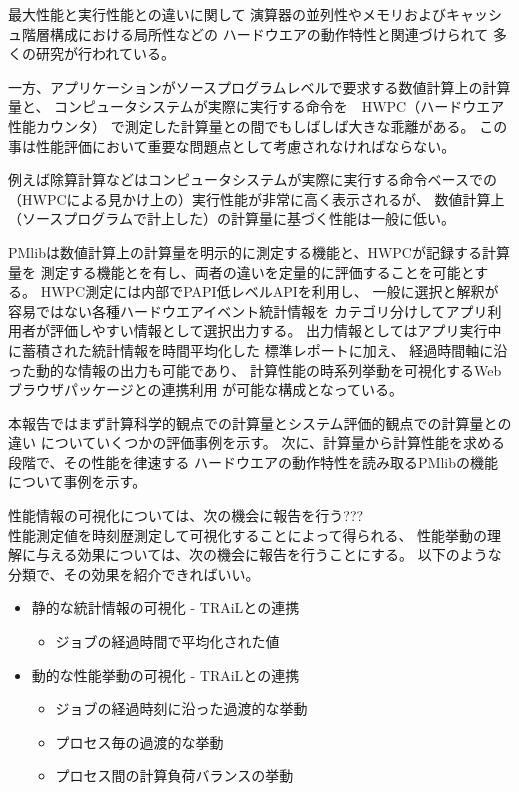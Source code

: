 \documentclass[submit,techrep,noauthor]{ipsj}
\begin{document}
最大性能と実行性能との違いに関して
演算器の並列性やメモリおよびキャッシュ階層構成における局所性などの
ハードウエアの動作特性と関連づけられて
多くの研究が行われている。

一方、アプリケーションがソースプログラムレベルで要求する数値計算上の計算量と、
コンピュータシステムが実際に実行する命令を　HWPC（ハードウエア性能カウンタ）
で測定した計算量との間でもしばしば大きな乖離がある。
この事は性能評価において重要な問題点として考慮されなければならない。

{ \color{blue}
例えば除算計算などはコンピュータシステムが実際に実行する命令ベースでの
（HWPCによる見かけ上の）実行性能が非常に高く表示されるが、
数値計算上（ソースプログラムで計上した）の計算量に基づく性能は一般に低い。
}

PMlibは数値計算上の計算量を明示的に測定する機能と、HWPCが記録する計算量を
測定する機能とを有し、両者の違いを定量的に評価することを可能とする。
HWPC測定には内部でPAPI低レベルAPIを利用し、
一般に選択と解釈が容易ではない各種ハードウエアイベント統計情報を
カテゴリ分けしてアプリ利用者が評価しやすい情報として選択出力する。
出力情報としてはアプリ実行中に蓄積された統計情報を時間平均化した
標準レポートに加え、
経過時間軸に沿った動的な情報の出力も可能であり、
計算性能の時系列挙動を可視化するWebブラウザパッケージとの連携利用
が可能な構成となっている。

本報告ではまず計算科学的観点での計算量とシステム評価的観点での計算量との違い
についていくつかの評価事例を示す。
次に、計算量から計算性能を求める段階で、その性能を律速する
ハードウエアの動作特性を読み取るPMlibの機能について事例を示す。

{ \color{blue}
性能情報の可視化については、次の機会に報告を行う???\\

性能測定値を時刻歴測定して可視化することによって得られる、
性能挙動の理解に与える効果については、次の機会に報告を行うことにする。
以下のような分類で、その効果を紹介できればいい。
\begin{itemize}
\item 静的な統計情報の可視化 - TRAiLとの連携
	\begin{itemize}
	\item ジョブの経過時間で平均化された値
	\end{itemize}
\item 動的な性能挙動の可視化 - TRAiLとの連携
	\begin{itemize}
	\item ジョブの経過時刻に沿った過渡的な挙動
	\item プロセス毎の過渡的な挙動
	\item プロセス間の計算負荷バランスの挙動
	\end{itemize}
\end{itemize}
}
\end{document}
